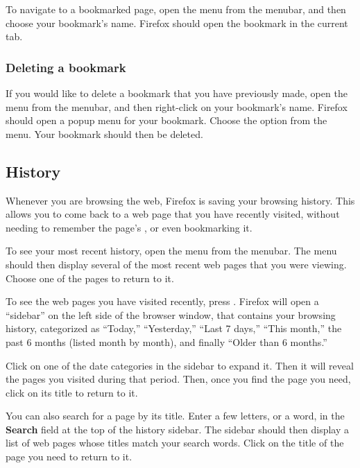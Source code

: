 To navigate to a bookmarked page, open the  menu from 
the menubar, and then choose your bookmark's name. Firefox should open the
bookmark in the current tab.


\subsubsection{Deleting a bookmark}

If you would like to delete a bookmark that you have previously made,
open the  menu from the menubar, and then right-click on
your bookmark's name. Firefox should open a popup menu for your bookmark.
Choose the  option from the menu. Your bookmark should then
be deleted.

\subsection{History}

Whenever you are browsing the web, Firefox is saving your browsing history.
This allows you to come back to a web page that you have recently visited, 
without needing to remember the page's , or even bookmarking it.

To see your most recent history, open the  menu from
the menubar. The menu should then display several of the most recent web pages
that you were viewing. Choose one of the pages to return to it.

To see the web pages you have visited recently, press . Firefox will 
open a ``sidebar'' on the left side of the browser window, that contains
your browsing history, categorized as ``Today,'' ``Yesterday,'' ``Last 7 days,'' ``This month,'' the past 6 months (listed month by month), and finally ``Older than 6 months.''

Click on one of the date categories in the sidebar to expand it. Then it will reveal the 
pages you visited during that period. Then, once you find the page you need, 
click on its title to return to it.

You can also search for a page by its title. Enter a few letters, or a word,
in the \textbf{Search} field at the top of the history sidebar. The sidebar 
should then display a list of web pages whose titles match your search words.
Click on the title of the page you need to return to it.

